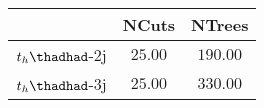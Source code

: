 \centering
\begin{tabular}{|c|c|c|} \hline
 & NCuts & NTrees\\\hline
$t_h\thadhad$-2j & $25.00$ & $190.00$\\\hline
$t_h\thadhad$-3j & $25.00$ & $330.00$\\\hline
\end{tabular} 